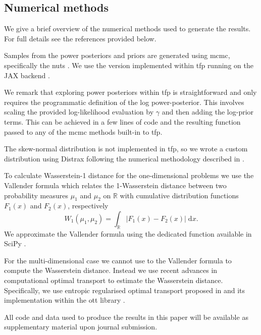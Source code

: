 \documentclass[12pt]{article}
\begin{document}
\subsection{Numerical methods}
We give a brief overview of the numerical methods used to generate the results.
For full details see the references provided below.

Samples from the power posteriors and priors are generated using \gls{mcmc},
specifically the \gls{nuts} \citep{hoffman2014}. We use the version implemented
within \gls{tfp} \citep{dillonTensorFlowDistributions2017} running on the JAX
backend \citep{jax2018github}.

We remark that exploring power posteriors within \gls{tfp} is straightforward
and only requires the programmatic definition of the log power-posterior. This
involves scaling the provided log-likelihood evaluation by $\gamma$ and then
adding the log-prior terms. This can be achieved in a few lines of code and the
resulting function passed to any of the \gls{mcmc} methods built-in to
\gls{tfp}.

The skew-normal distribution is not implemented in \gls{tfp}, so we wrote a
custom distribution using Distrax \citep{deepmind2020jax} following the
numerical methodology described in \citep{ghorbanzadeh_method_2014}. 

To calculate Wasserstein-1 distance for the one-dimensional problems we use the
Vallender formula \cite{vallender_calculation_1974} which relates the
1-Wasserstein distance between two probability measures $\mu_1$ and $\mu_2$ on
$\mathbb{R}$ with cumulative distribution functions $F_1(x)$ and $F_2(x)$,
respectively
\begin{equation}
W_1(\mu_1, \mu_2) = \int_{\mathbb{R}} | F_1(x) - F_2(x) | \; \mathrm{d}x.
\end{equation}
We approximate the Vallender formula using the dedicated function available in
SciPy \citep{2020SciPy-NMeth}. 

For the multi-dimensional case we cannot use to the Vallender formula to
compute the Wasserstein distance. Instead we use recent advances in
computational optimal transport to estimate the Wasserstein distance.
Specifically, we use entropic regularised optimal transport proposed in
\citep{NIPS2013_af21d0c9} and its implementation within the \gls{ott} library
\citep{cuturi2022optimal}. 


All code and data used to produce the results in this paper will be available
as supplementary material upon journal submission.
\end{document}
